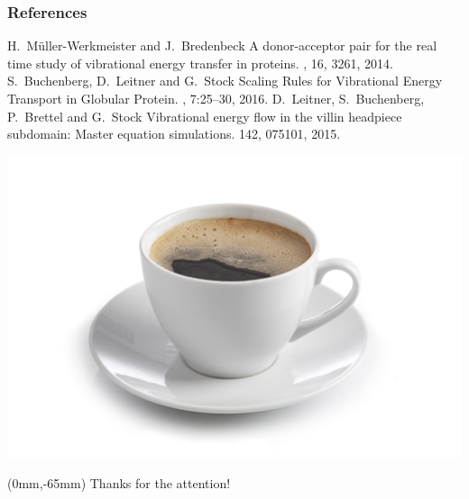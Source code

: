 \begin{frame}[allowframebreaks]
  \frametitle<presentation>{References}    
  \begin{thebibliography}{10}    
  \beamertemplatearticlebibitems
    H.~M\"uller-Werkmeister and J.~Bredenbeck
    \newblock A donor-acceptor pair for the real time study of vibrational energy transfer in proteins.
    , 16, 3261, 2014.
  \beamertemplatearticlebibitems
    S.~Buchenberg, D.~Leitner and G.~Stock
    \newblock Scaling Rules for Vibrational Energy Transport in Globular Protein.
    , 7:25--30, 2016.
  \beamertemplatearticlebibitems
    D.~Leitner, S.~Buchenberg, P.~Brettel and G.~Stock
    \newblock Vibrational energy flow in the villin headpiece subdomain: Master equation simulations.
     142, 075101, 2015.
  \end{thebibliography}
\end{frame}

\begin{frame}[t]
  \includegraphics[width=0.8\paperwidth]{coffee.jpg}
  \begin{textblock*}{0.8\textwidth}(0mm,-65mm)
    \huge{Thanks for the attention!}
  \end{textblock*}
\end{frame}

